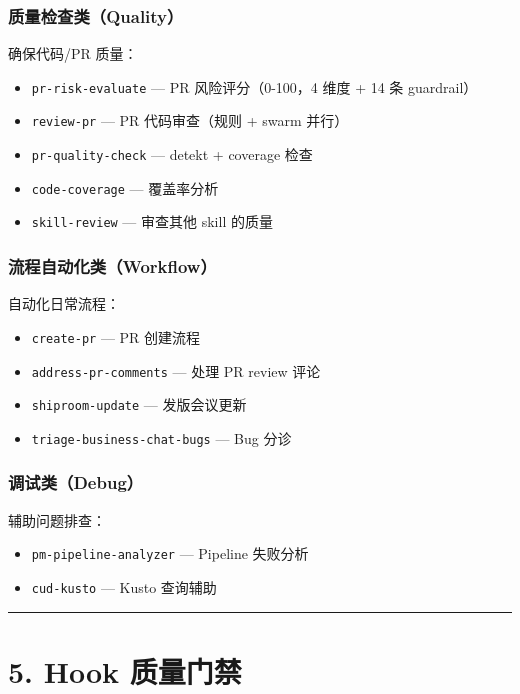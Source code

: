 \subsubsection{质量检查类（Quality）}
确保代码/PR 质量：

\begin{itemize}[leftmargin=2em]
\item \texttt{pr-risk-evaluate} --- PR 风险评分（0-100，4 维度 + 14 条 guardrail）
\item \texttt{review-pr} --- PR 代码审查（规则 + swarm 并行）
\item \texttt{pr-quality-check} --- detekt + coverage 检查
\item \texttt{code-coverage} --- 覆盖率分析
\item \texttt{skill-review} --- 审查其他 skill 的质量
\end{itemize}

\subsubsection{流程自动化类（Workflow）}
自动化日常流程：

\begin{itemize}[leftmargin=2em]
\item \texttt{create-pr} --- PR 创建流程
\item \texttt{address-pr-comments} --- 处理 PR review 评论
\item \texttt{shiproom-update} --- 发版会议更新
\item \texttt{triage-business-chat-bugs} --- Bug 分诊
\end{itemize}

\subsubsection{调试类（Debug）}
辅助问题排查：

\begin{itemize}[leftmargin=2em]
\item \texttt{pm-pipeline-analyzer} --- Pipeline 失败分析
\item \texttt{cud-kusto} --- Kusto 查询辅助
\end{itemize}

\bigskip\hrule\bigskip

\section{5. Hook 质量门禁}

